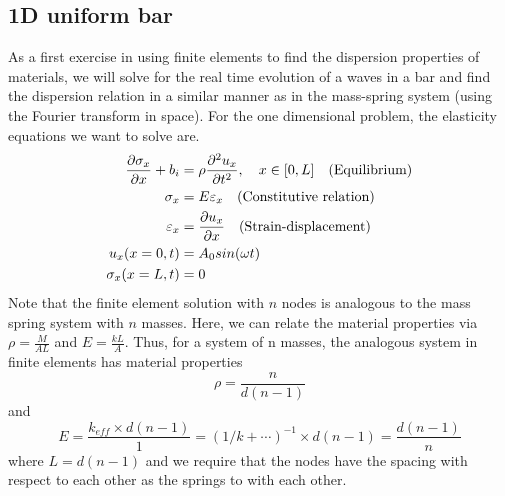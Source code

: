 \documentclass{article}
\begin{document}
\subsection{1D uniform bar}
As a first exercise in using finite elements to find the dispersion properties 
of materials, we will solve for the real time evolution of a waves in a bar and 
find the dispersion relation in a similar manner as in the mass-spring system 
(using the Fourier transform in space). For the one dimensional problem, the 
elasticity equations we want to solve are.
\begin{align}
\frac{\partial \sigma_x}{\partial x} + b_i &= \rho \frac{\partial^2 
u_x}{\partial t^2},\quad x\in[0,L]\quad\textnormal{(Equilibrium)} \\
\sigma_x &= E \varepsilon_x\quad\textnormal{(Constitutive relation)}\\
\varepsilon_x &= \frac{\partial u_x}{\partial 
x}\quad\textnormal{(Strain-displacement)}\\
u_x(x=0,t) &= A_0sin(\omega t) \\
\sigma_x(x=L,t) &= 0
\end{align}
Note that the finite element solution with $n$ nodes is analogous to the mass 
spring system with $n$ masses. Here, we can relate the material properties via 
$\rho = \frac{M}{AL}$ and $E = \frac{kL}{A}$. Thus, for a system of n masses, 
the analogous system in finite elements has material properties
\begin{equation}
\rho = \frac{n}{d(n-1)}
\end{equation}
and
\begin{equation}
E = \frac{k_{eff}\times d(n-1)}{1}= (1/k +\cdots)^{-1} \times d(n-1)= 
\frac{d(n-1)}{n}
\end{equation}
where $L=d(n-1)$ and we require that the nodes have the spacing with respect to 
each other as the springs to with each other.
\end{document}
